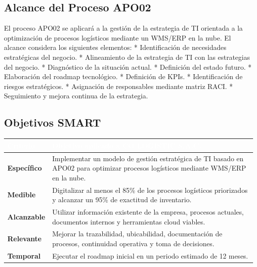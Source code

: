 \documentclass[11pt]{article}
\newcounter{none} %
\begin{document}
\subsection{Alcance del Proceso APO02}
El proceso APO02 se aplicará a la gestión de la estrategia de TI orientada a la optimización de procesos logísticos mediante un WMS/ERP en la nube. El alcance considera los siguientes elementos:
* Identificación de necesidades estratégicas del negocio.
* Alineamiento de la estrategia de TI con las estrategias del negocio.
* Diagnóstico de la situación actual.
* Definición del estado futuro.
* Elaboración del roadmap tecnológico.
* Definición de KPIs.
* Identificación de riesgos estratégicos.
* Asignación de responsables mediante matriz RACI.
* Seguimiento y mejora continua de la estrategia.

\subsection{Objetivos SMART}

\vspace{0.3cm}
\setlength{\tabcolsep}{6pt}
\renewcommand{\arraystretch}{1.5}
{\def\LTcaptype{none}
\begin{longtable}[]{@{}
  >{\centering\arraybackslash}p{0.18\linewidth}
  >{\raggedright\arraybackslash}p{0.82\linewidth}@{}}
\rowcolor{DeepNavy}
\textcolor{white}{\textbf{Criterio}} & \textcolor{white}{\textbf{Objetivo aplicado a CO LOGISTIC S.A.C.}} \\ \hline
\endhead
\rowcolor{LightGray}
\textbf{Específico} & Implementar un modelo de gestión estratégica de TI basado en APO02 para optimizar procesos logísticos mediante WMS/ERP en la nube. \\ \hline
\textbf{Medible} & Digitalizar al menos el 85\% de los procesos logísticos priorizados y alcanzar un 95\% de exactitud de inventario. \\ \hline
\rowcolor{LightGray}
\textbf{Alcanzable} & Utilizar información existente de la empresa, procesos actuales, documentos internos y herramientas cloud viables. \\ \hline
\textbf{Relevante} & Mejorar la trazabilidad, ubicabilidad, documentación de procesos, continuidad operativa y toma de decisiones. \\ \hline
\rowcolor{LightGray}
\textbf{Temporal} & Ejecutar el roadmap inicial en un periodo estimado de 12 meses. \\ \hline
\end{longtable}
}
\end{document}
